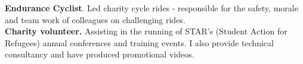 \documentclass[11pt]{article}
\begin{document}
\textbf{Endurance Cyclist}. Led charity cycle rides - responsible for the safety, morale and team work of colleagues on challenging rides.\\
\noindent \textbf{Charity volunteer.} Assisting in the running of STAR's (Student Action for Refugees) annual conferences and training events.
I also provide technical consultancy and have produced promotional videos.

\end{document}
